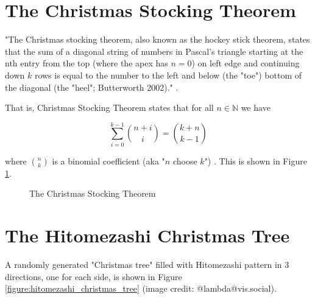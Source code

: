 \documentclass{article}
\theoremstyle{definition}
\begin{document}
\section{The Christmas Stocking Theorem}
"The Christmas stocking theorem, also known as the hockey stick
theorem, states that the sum of a diagonal string of numbers in
Pascal's triangle starting at the nth entry from the top (where
the apex has $n = 0$) on left edge and continuing down $k$ rows
is equal to the number to the left and below (the "toe") bottom
of the diagonal (the "heel"; Butterworth 2002)."
\cite{christmas_stocking_theorem}.

\bigskip
\noindent
That is, Christmas Stocking Theorem states that for all $n \in
\mathbb{N}$ we have

\medskip
\begin{equation*}
\sum\limits_{i=0}^{k-1} {n+i \choose i} = {k+n \choose k-1}
\end{equation*}

\smallskip
{
\noindent
where ${\displaystyle {n \choose k}}$ is a binomial coefficient
(aka "$n$ choose $k$") \cite{wiki:binomial_coefficient}. This
is shown in Figure
\ref{fig:christmas_stocking_theorem}.  \par}


\vspace{1.25em}
\begin{figure} [H]
  \caption{The Christmas Stocking Theorem}
  \label{fig:christmas_stocking_theorem}
\end{figure}

\section{The Hitomezashi Christmas Tree}
A randomly generated "Christmas tree" filled with 
Hitomezashi pattern in 3 directions, one for each side,
is shown in Figure \ref{figure:hitomezashi_christmas_tree}
(image credit: @lambda@vis.social).
\end{document}
